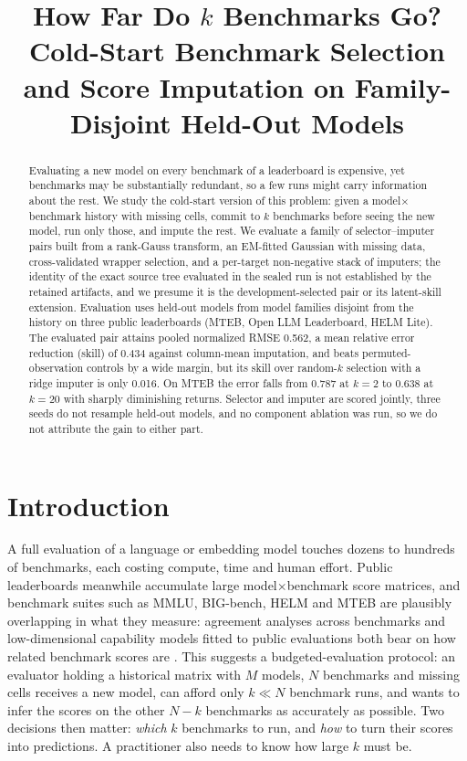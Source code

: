 \documentclass{article}
\title{How Far Do $k$ Benchmarks Go? Cold-Start Benchmark Selection and Score Imputation on Family-Disjoint Held-Out Models}
\begin{document}
\maketitle

\begin{abstract}
Evaluating a new model on every benchmark of a leaderboard is expensive, yet benchmarks may be substantially redundant, so a few runs might carry information about the rest. We study the cold-start version of this problem: given a model$\times$benchmark history with missing cells, commit to $k$ benchmarks before seeing the new model, run only those, and impute the rest. We evaluate a family of selector--imputer pairs built from a rank-Gauss transform, an EM-fitted Gaussian with missing data, cross-validated wrapper selection, and a per-target non-negative stack of imputers; the identity of the exact source tree evaluated in the sealed run is not established by the retained artifacts, and we presume it is the development-selected pair or its latent-skill extension. Evaluation uses held-out models from model families disjoint from the history on three public leaderboards (MTEB, Open LLM Leaderboard, HELM Lite). The evaluated pair attains pooled normalized RMSE 0.562, a mean relative error reduction (skill) of 0.434 against column-mean imputation, and beats permuted-observation controls by a wide margin, but its skill over random-$k$ selection with a ridge imputer is only 0.016. On MTEB the error falls from 0.787 at $k{=}2$ to 0.638 at $k{=}20$ with sharply diminishing returns. Selector and imputer are scored jointly, three seeds do not resample held-out models, and no component ablation was run, so we do not attribute the gain to either part.
\end{abstract}

\section{Introduction}
A full evaluation of a language or embedding model touches dozens to hundreds of benchmarks, each costing compute, time and human effort. Public leaderboards meanwhile accumulate large model$\times$benchmark score matrices, and benchmark suites such as MMLU, BIG-bench, HELM and MTEB \citep{Hendrycks2021MMLU,Srivastava2023BIGbench,Liang2023HELM,Muennighoff2023MTEB} are plausibly overlapping in what they measure: agreement analyses across benchmarks and low-dimensional capability models fitted to public evaluations both bear on how related benchmark scores are \citep{Perlitz2024BenchBench,Ruan2024ObservationalScaling,Polo2024Sloth}. This suggests a budgeted-evaluation protocol: an evaluator holding a historical matrix with $M$ models, $N$ benchmarks and missing cells receives a new model, can afford only $k\ll N$ benchmark runs, and wants to infer the scores on the other $N-k$ benchmarks as accurately as possible. Two decisions then matter: \emph{which} $k$ benchmarks to run, and \emph{how} to turn their scores into predictions. A practitioner also needs to know how large $k$ must be.
\end{document}
